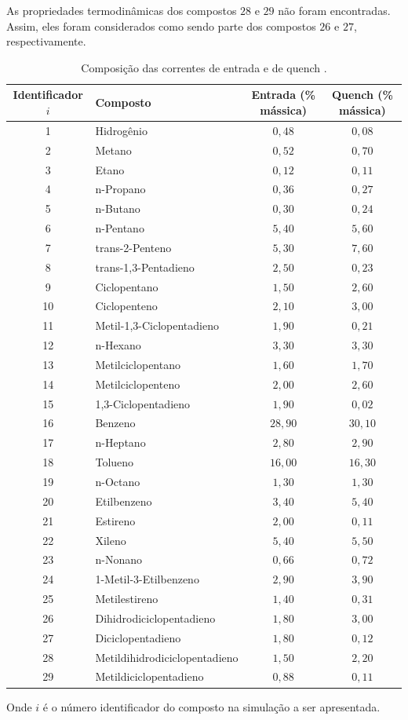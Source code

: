 As propriedades termodinâmicas dos compostos $28$ e $29$ não foram
encontradas. Assim, eles foram considerados como sendo parte dos compostos
$26$ e $27$, respectivamente.

\begin{table}[!htb]
\begin{center}
\caption{Composição das correntes de entrada e de quench \cite{Rojas2014a}.}
\label{tab:composicao}
\small
\begin{tabular}{clcc}
{Identificador $i$} & {Composto} & Entrada (\% mássica) & Quench (\% mássica)
\\
\hline
1 & Hidrogênio				& $0,48$ & $0,08$ \\
2 & Metano					& $0,52$ & $0,70$ \\
3 & Etano					& $0,12$ & $0,11$ \\
4 & n-Propano				& $0,36$ & $0,27$ \\
5 & n-Butano				& $0,30$ & $0,24$ \\
6 & n-Pentano				& $5,40$ & $5,60$ \\
7 & trans-2-Penteno			& $5,30$ & $7,60$\\
8 & trans-1,3-Pentadieno	& $2,50$ & $0,23$ \\
9 & Ciclopentano			& $1,50$ & $2,60$ \\
10& Ciclopenteno			& $2,10$ & $3,00$ \\
11& Metil-1,3-Ciclopentadieno	& $1,90$ & $0,21$ \\
12& n-Hexano				& $3,30$ & $3,30$ \\
13& Metilciclopentano		& $1,60$ & $1,70$ \\
14& Metilciclopenteno		& $2,00$ & $2,60$ \\
15& 1,3-Ciclopentadieno		& $1,90$ & $0,02$ \\
16& Benzeno					& $28,90$ & $30,10$ \\
17& n-Heptano				& $2,80$ & $2,90$ \\
18& Tolueno					& $16,00$ & $16,30$ \\
19& n-Octano				& $1,30$ & $1,30$ \\
20& Etilbenzeno				& $3,40$ & $5,40$ \\
21& Estireno				& $2,00$ & $0,11$ \\
22& Xileno					& $5,40$ & $5,50$ \\
23& n-Nonano				& $0,66$ & $0,72$ \\
24& 1-Metil-3-Etilbenzeno	& $2,90$ & $3,90$ \\
25& Metilestireno			& $1,40$ & $0,31$ \\
26& Dihidrodiciclopentadieno	& $1,80$ & $3,00$ \\
27& Diciclopentadieno		& $1,80$ & $0,12$ \\
28& Metildihidrodiciclopentadieno	& $1,50$ & $2,20$ \\
29& Metildiciclopentadieno	& $0,88$ & $0,11$ \\
\bottomrule
\end{tabular}
\end{center}
Onde $i$ é o número identificador do composto na simulação a ser apresentada.
\end{table}

